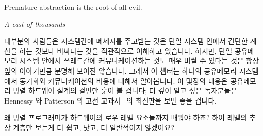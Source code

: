 

\epigraph{Premature abstraction is the root of all evil.}
	 {\emph{A cast of thousands}}

대부분의 사람들은 시스템간에 메세지를 주고받는 것은 단일 시스템 안에서 간단한
계산을 하는 것보다 비싸다는 것을 직관적으로 이해하고 있습니다.
하지만, 단일 공유메모리 시스템 안에서 쓰레드간에 커뮤니케이션하는 것도 매우
비쌀 수 있다는 것은 항상 앞의 이야기만큼 분명해 보이진 않습니다.
그래서 이 챕터는 하나의 공유메모리 시스템에서 동기화와 커뮤니케이션의 비용에
대해서 알아봅니다.
이 몇장의 내용은 공유메모리 병렬 하드웨어 설계의 겉면만 훑어 볼 겁니다; 더 깊이
알고 싶은 독자분들은 Hennessy 와 Patterson 의 고전 교과서~\cite{Hennessy95a} 의
최신판을 보면 좋을 겁니다.
\iffalse

Most people have an intuitive understanding that passing messages between
systems is considerably more expensive than performing simple calculations
within the confines of a single system.
However, it is not always so clear that communicating among threads within
the confines of a single shared-memory system can also be quite expensive.
This chapter therefore looks at the cost of synchronization and communication
within a shared-memory system.
These few pages can do no more than scratch the surface of shared-memory
parallel hardware design; readers desiring more detail would do well
to start with a recent edition of Hennessy and Patterson's classic
text~\cite{Hennessy2011,Hennessy95a}.
\fi

\QuickQuiz{}
	왜 병렬 프로그래머가 하드웨어의 로우 레벨 요소들까지 배워야 하죠?
	하이 레벨의 추상 계층만 보는게 더 쉽고, 낫고, 더 일반적이지 않겠어요?

